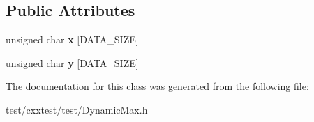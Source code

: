 \subsection*{Public Attributes}
\begin{DoxyCompactItemize}
\item 
\hypertarget{classDynamicMax_a1eb90dc5efcd810759bb613d3acb2290}{unsigned char {\bfseries x} \mbox{[}D\-A\-T\-A\-\_\-\-S\-I\-Z\-E\mbox{]}}\label{classDynamicMax_a1eb90dc5efcd810759bb613d3acb2290}

\item 
\hypertarget{classDynamicMax_a7786547534a3a5c66c523ccb73425c7a}{unsigned char {\bfseries y} \mbox{[}D\-A\-T\-A\-\_\-\-S\-I\-Z\-E\mbox{]}}\label{classDynamicMax_a7786547534a3a5c66c523ccb73425c7a}

\end{DoxyCompactItemize}


The documentation for this class was generated from the following file\-:\begin{DoxyCompactItemize}
\item 
test/cxxtest/test/Dynamic\-Max.\-h\end{DoxyCompactItemize}
